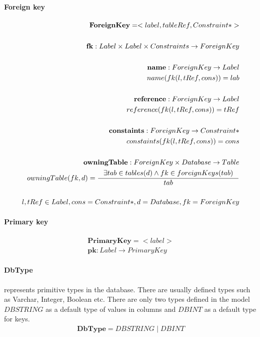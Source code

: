 \documentclass[11pt]{article}
\begin{document}
\paragraph{Foreign key}
\begin{align*}
	\mathbf{ForeignKey} = <label, tableRef, Constraint*> \\ \\
	\mathbf{fk} : Label \times Label \times Constraints \rightarrow ForeignKey \\ \\
	\mathbf{name} : ForeignKey \rightarrow Label \\
	name(fk(l, tRef, cons)) = lab  \\ \\
	\mathbf{reference} : ForeignKey \rightarrow Label  \\
	reference(fk(l, tRef, cons)) = tRef  \\ \\
	\mathbf{constaints} : ForeignKey \rightarrow Constraint*  \\
	constaints(fk(l, tRef, cons)) = cons  \\ \\
	\mathbf{owningTable} : ForeignKey \times Database \rightarrow Table  \\
	owningTable(fk, d) = \inference{\exists tab \in tables(d) \wedge fk \in foreignKeys(tab)}{tab}\\\\
	l, tRef \in Label, cons = Constraint*, d = Database, fk = ForeignKey
\end{align*}


\paragraph{Primary key}
\begin{align*}
	\mathbf{PrimaryKey} =  < label > 	\\
	\mathbf{pk} : Label \rightarrow PrimaryKey
\end{align*}

\paragraph{DbType} represents primitive types in the database. There are usually defined types such as Varchar, Integer, Boolean etc. There are only two types defined in the model $DBSTRING$ as a default type of values in columns and $DBINT$ as a default type for keys.
\begin{align*}
	\mathbf{DbType} = DBSTRING \; | \; DBINT 
\end{align*}
\end{document}
